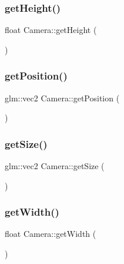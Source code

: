 \subsubsection{\texorpdfstring{get\+Height()}{getHeight()}}
{\footnotesize\ttfamily float Camera\+::get\+Height (\begin{DoxyParamCaption}{ }\end{DoxyParamCaption})\hspace{0.3cm}{\ttfamily [inline]}}

\mbox{\label{class_camera_a6628404766f5ca99066d58e119720c6c}} 
\subsubsection{\texorpdfstring{get\+Position()}{getPosition()}}
{\footnotesize\ttfamily glm\+::vec2 Camera\+::get\+Position (\begin{DoxyParamCaption}{ }\end{DoxyParamCaption})\hspace{0.3cm}{\ttfamily [inline]}}

\mbox{\label{class_camera_ac495b981e1eea213d429e49bb59a5f6b}} 
\subsubsection{\texorpdfstring{get\+Size()}{getSize()}}
{\footnotesize\ttfamily glm\+::vec2 Camera\+::get\+Size (\begin{DoxyParamCaption}{ }\end{DoxyParamCaption})\hspace{0.3cm}{\ttfamily [inline]}}

\mbox{\label{class_camera_a17a09a5d85ed62c92c3c17969e4b2df3}} 
\subsubsection{\texorpdfstring{get\+Width()}{getWidth()}}
{\footnotesize\ttfamily float Camera\+::get\+Width (\begin{DoxyParamCaption}{ }\end{DoxyParamCaption})\hspace{0.3cm}{\ttfamily [inline]}}

